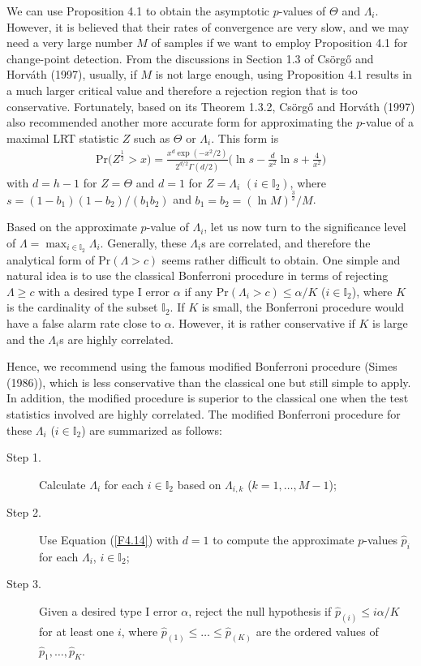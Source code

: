 We can use Proposition 4.1 to obtain the asymptotic $p$-values of $\Theta$ and
$\Lambda_i$. However, it is believed that their rates of convergence are very slow,
and we may need a very large number $M$ of samples if we want to employ Proposition
4.1 for change-point detection. From the discussions in Section 1.3 of
Cs\"{o}rg\H{o} and Horv\'{a}th (1997), usually, if $M$ is not large enough, using
Proposition 4.1 results in a much larger critical value and therefore a rejection
region that is too conservative. Fortunately, based on its Theorem 1.3.2,
Cs\"{o}rg\H{o} and Horv\'{a}th (1997) also recommended another more accurate form
for approximating the $p$-value of a maximal LRT statistic $Z$ such as $\Theta$ or
$\Lambda_i$. This form is
\begin{align}
\mathrm{Pr}\big(Z^{\frac{1}{2}}>x\big)=\frac{x^d\exp(-x^2/2)}{2^{d/2}\Gamma(d/2)}
\Big(\ln s-\frac{d}{x^2}\ln s+\frac{4}{x^2}\Big)\label{F4.14}
\end{align}
with $d=h-1$ for $Z=\Theta$ and $d=1$ for $Z=\Lambda_i$ $(i\in\mathbb{I}_2)$, where
$s=(1-b_1)(1-b_2)/(b_1b_2)$ and $b_1=b_2=(\ln M)^{\frac{3}{2}}/M$.

Based on the approximate $p$-value of $\Lambda_i$, let us now turn to the
significance level of $\Lambda=\max_{i\in\mathbb{I}_2}\Lambda_i$. Generally, these
$\Lambda_i$s are correlated, and therefore the analytical form of
$\mathrm{Pr}(\Lambda>c)$ seems rather difficult to obtain. One simple and natural
idea is to use the classical Bonferroni procedure in terms of rejecting $\Lambda\geq
c$ with a desired type I error $\alpha$ if any
$\mathrm{Pr}(\Lambda_i>c)\leq\alpha/K$ ($i\in\mathbb{I}_2$), where $K$ is the
cardinality of the subset $\mathbb{I}_2$. If $K$ is small, the Bonferroni procedure
would have a false alarm rate close to $\alpha$. However, it is rather conservative
if $K$ is large and the $\Lambda_i$s are highly correlated.

Hence, we recommend using the famous modified Bonferroni procedure (Simes (1986)),
which is less conservative than the classical one but still simple to apply. In
addition, the modified procedure is superior to the classical one when the test
statistics involved are highly correlated. The modified Bonferroni procedure for
these $\Lambda_i$ ($i\in\mathbb{I}_2$) are summarized as follows:
\begin{description}
\item[Step 1.] Calculate $\Lambda_i$ for each
$i\in\mathbb{I}_2$ based on $\Lambda_{i,k}$ ($k=1,\ldots,M-1$);
\item[Step 2.] Use Equation (\ref{F4.14}) with $d=1$ to compute the
approximate $p$-values $\hat{p}_i$ for each $\Lambda_i$, $i\in\mathbb{I}_2$;
\item[Step 3.] Given a desired type I error $\alpha$, reject
the null hypothesis if $\hat{p}_{(i)}\leq i\alpha/K$ for at least one $i$, where
$\hat{p}_{(1)}\leq\ldots\leq\hat{p}_{(K)}$ are the ordered values of
$\hat{p}_{1},\ldots,\hat{p}_{K}$.
\end{description}

